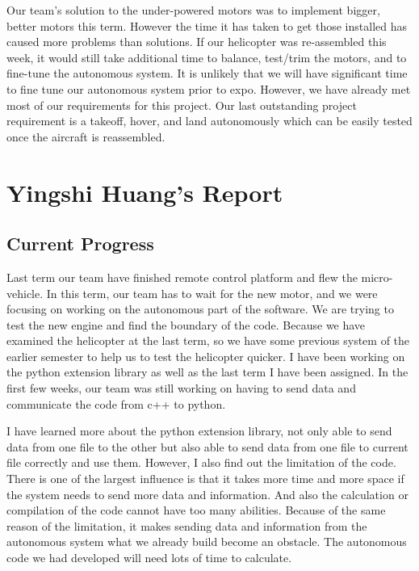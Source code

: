 \documentclass[onecolumn, draftclsnofoot,10pt, compsoc]{IEEEtran}
\begin{document}
Our team’s solution to the under-powered motors was to implement bigger, better motors this term. However the time it has taken to get those installed has caused more problems than solutions. If our helicopter was re-assembled this week, it would still take additional time to balance, test/trim the motors, and to fine-tune the autonomous system. It is unlikely that we will have significant time to fine tune our autonomous system prior to expo. However, we have already met most of our requirements for this project. Our last outstanding project requirement is a takeoff, hover, and land autonomously which can be easily tested once the aircraft is reassembled.





\section{Yingshi Huang's Report}

\subsection{Current Progress}

Last term our team have finished remote control platform and flew the micro-vehicle. In this term, our team has to wait for the new motor, and we were focusing on working on the autonomous part of the software. We are trying to test the new engine and find the boundary of the code. Because we have examined the helicopter at the last term, so we have some previous system of the earlier semester to help us to test the helicopter quicker. I have been working on the python extension library as well as the last term I have been assigned. In the first few weeks, our team was still working on having to send data and communicate the code from c++ to python.

I have learned more about the python extension library, not only able to send data from one file to the other but also able to send data from one file to current file correctly and use them. However, I also find out the limitation of the code. There is one of the largest influence is that it takes more time and more space if the system needs to send more data and information. And also the calculation or compilation of the code cannot have too many abilities. Because of the same reason of the limitation, it makes sending data and information from the autonomous system what we already build become an obstacle. The autonomous code we had developed will need lots of time to calculate.
\end{document}
